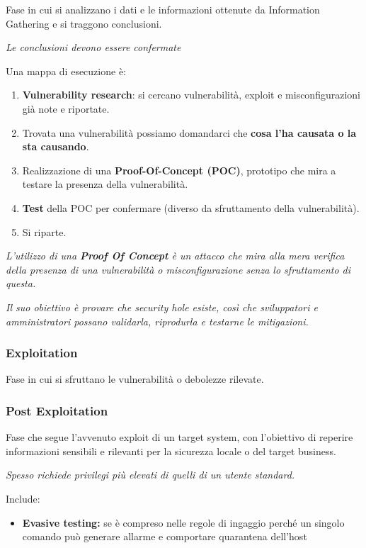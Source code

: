 Fase in cui si analizzano i dati e le informazioni ottenute da
Information Gathering e si traggono conclusioni.

\emph{Le conclusioni devono essere confermate}

Una mappa di esecuzione è:

\begin{enumerate}
\def\labelenumi{\arabic{enumi}.}
\item
  \textbf{Vulnerability research}: si cercano vulnerabilità, exploit e
  misconfigurazioni già note e riportate.
\item
  Trovata una vulnerabilità possiamo domandarci che \textbf{cosa l'ha
  causata o la sta causando}.
\item
  Realizzazione di una \textbf{Proof-Of-Concept (POC)}, prototipo che
  mira a testare la presenza della vulnerabilità.
\item
  \textbf{Test} della POC per confermare (diverso da sfruttamento della
  vulnerabilità).
\item
  Si riparte.
\end{enumerate}

\emph{L'utilizzo di una \textbf{Proof Of Concept} è un attacco che mira
alla mera verifica della presenza di una vulnerabilità o
misconfigurazione senza lo sfruttamento di questa.}

\emph{Il suo obiettivo è provare che security hole esiste, così che
sviluppatori e amministratori possano validarla, riprodurla e testarne
le mitigazioni.}

\subsubsection{Exploitation}\label{exploitation}

Fase in cui si sfruttano le vulnerabilità o debolezze rilevate.

\subsubsection{Post Exploitation}\label{post-exploitation}

Fase che segue l'avvenuto exploit di un target system, con l'obiettivo
di reperire informazioni sensibili e rilevanti per la sicurezza locale o
del target business.

\emph{Spesso richiede privilegi più elevati di quelli di un utente
standard.}

Include:

\begin{itemize}
\item
  \textbf{Evasive testing:} se è compreso nelle regole di ingaggio
  perché un singolo comando può generare allarme e comportare quarantena
  dell'host
\end{itemize}

